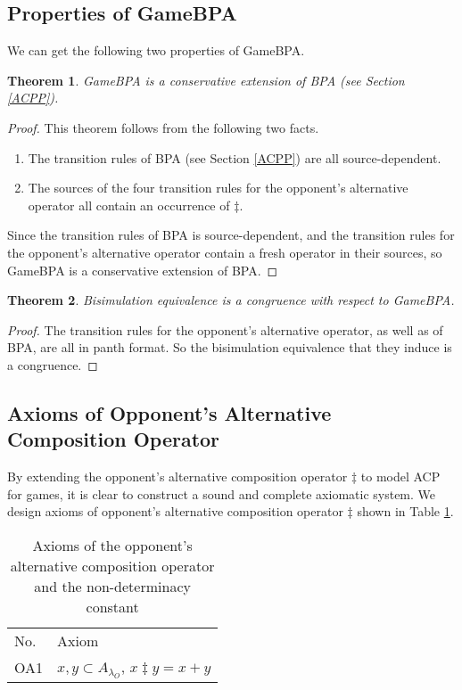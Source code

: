 \documentclass{fac}
\newtheorem{theorem}{Theorem}[section]
\begin{document}
\subsection{Properties of GameBPA}

We can get the following two properties of GameBPA.

\begin{theorem}
GameBPA is a conservative extension of BPA (see Section \ref{ACPP}).
\end{theorem}

\begin{proof}
This theorem follows from the following two facts.

\begin{enumerate}
  \item The transition rules of BPA (see Section \ref{ACPP}) are all source-dependent.
  \item The sources of the four transition rules for the opponent's alternative operator all contain an occurrence of $\ddagger$.
\end{enumerate}

Since the transition rules of BPA is source-dependent, and the transition rules for the opponent's alternative operator contain a fresh operator in their
sources, so GameBPA is a conservative extension of BPA.
\end{proof}

\begin{theorem}
Bisimulation equivalence is a congruence with respect to GameBPA.
\end{theorem}

\begin{proof}
The transition rules for the opponent's alternative operator, as well as of BPA, are all in panth format. So the bisimulation equivalence that they induce is a congruence.
\end{proof}

\subsection{Axioms of Opponent's Alternative Composition Operator}

By extending the opponent's alternative composition operator $\ddagger$ to model ACP for games, it is clear to construct a sound and complete axiomatic system. We design axioms of opponent's alternative composition operator $\ddagger$ shown in Table \ref{AxiomOfOAC}.

\begin{center}
\begin{table}
  \begin{tabular}{@{}ll@{}}
\hline No. &Axiom\\
  OA1 & $x, y\subset A_{\lambda_O}$, $x \ddagger y= x + y$ \\
\end{tabular}
\caption{Axioms of the opponent's alternative composition operator and the non-determinacy constant}
\label{AxiomOfOAC}
\end{table}
\end{center}
\end{document}

